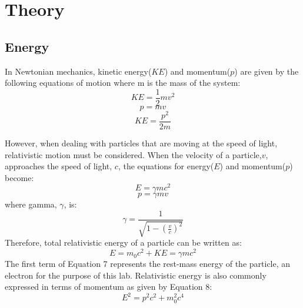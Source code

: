 \section{Theory}

\subsection{Energy}
In Newtonian mechanics, kinetic energy($KE$) and momentum($p$) are given by the following equations of motion where m is the mass of the system:
\begin{equation}KE= \frac{1}{2}mv^2 \end{equation}
\begin{equation} p=mv \end{equation}
\begin {equation}KE=\frac{p^2}{2m} \end{equation}

However, when dealing with particles that are moving at the speed of light, relativistic motion must be considered. When the velocity of a particle,$v$, approaches the speed of light, $c$, the equations for energy($E$) and momentum($p$) become:
\begin{equation} E=\gamma mc^2\end{equation}
\begin{equation} p=\gamma mv\end{equation}
where gamma, $\gamma$, is:
\begin{equation} \gamma= \frac{1}{\sqrt{1-(\frac{v}{c})^2}}\end{equation}
Therefore, total relativistic energy of a particle can be written as:
\begin{equation} E=m_0c^2+KE=\gamma mc^2\end{equation}
The first term of Equation 7 represents the rest-mass energy of the particle, an electron for the purpose of this lab. Relativistic energy is also commonly expressed in terms of momentum as given by Equation 8:
\begin{equation}E^2=p^2c^2+m_0^2c^4\end{equation}

